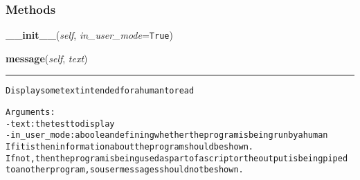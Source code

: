     \label{lib:message:Message}


  \subsubsection{Methods}

    \label{lib:message:Message:__init__}

    \vspace{0.5ex}

\hspace{.8\funcindent}\begin{boxedminipage}{\funcwidth}

    \raggedright \textbf{\_\_init\_\_}(\textit{self}, \textit{in\_user\_mode}={\tt True})

\setlength{\parskip}{2ex}
\setlength{\parskip}{1ex}
    \end{boxedminipage}

    \label{lib:message:Message:message}

    \vspace{0.5ex}

\hspace{.8\funcindent}\begin{boxedminipage}{\funcwidth}

    \raggedright \textbf{message}(\textit{self}, \textit{text})

    \vspace{-1.5ex}

    \rule{\textwidth}{0.5\fboxrule}
\setlength{\parskip}{2ex}
\begin{alltt}

Display some text intended for a human to read

Arguments:
- text: the test to display
- in\_user\_mode: a boolean defining whether the program is being run by a human
If it is then information about the program should be shown.
If not, then the program is being used as part of a script or the output is being piped
to another program, so user messages should not be shown.
\end{alltt}

\setlength{\parskip}{1ex}
    \end{boxedminipage}

